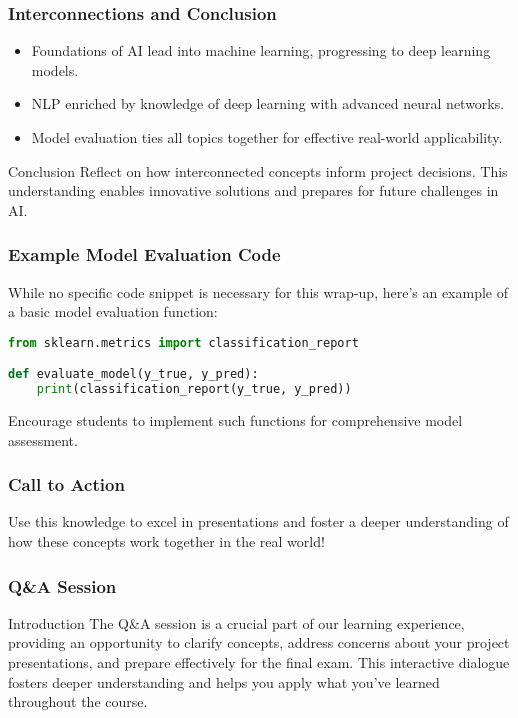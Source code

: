 \documentclass[aspectratio=169]{beamer}
\begin{document}
\begin{frame}[fragile]
    \frametitle{Interconnections and Conclusion}
    \begin{itemize}
        \item Foundations of AI lead into machine learning, progressing to deep learning models.
        \item NLP enriched by knowledge of deep learning with advanced neural networks.
        \item Model evaluation ties all topics together for effective real-world applicability.
    \end{itemize}

    \begin{block}{Conclusion}
        Reflect on how interconnected concepts inform project decisions. This understanding enables innovative solutions and prepares for future challenges in AI.
    \end{block}
\end{frame}

\begin{frame}[fragile]
    \frametitle{Example Model Evaluation Code}
    While no specific code snippet is necessary for this wrap-up, here's an example of a basic model evaluation function:
    \begin{lstlisting}[language=Python]
from sklearn.metrics import classification_report

def evaluate_model(y_true, y_pred):
    print(classification_report(y_true, y_pred))
    \end{lstlisting}
    Encourage students to implement such functions for comprehensive model assessment.
\end{frame}

\begin{frame}[fragile]
    \frametitle{Call to Action}
    Use this knowledge to excel in presentations and foster a deeper understanding of how these concepts work together in the real world!
\end{frame}

\begin{frame}[fragile]
    \frametitle{Q\&A Session}
    \begin{block}{Introduction}
        The Q\&A session is a crucial part of our learning experience, providing an opportunity to clarify concepts, address concerns about your project presentations, and prepare effectively for the final exam. This interactive dialogue fosters deeper understanding and helps you apply what you’ve learned throughout the course.
    \end{block}
\end{frame}
\end{document}

